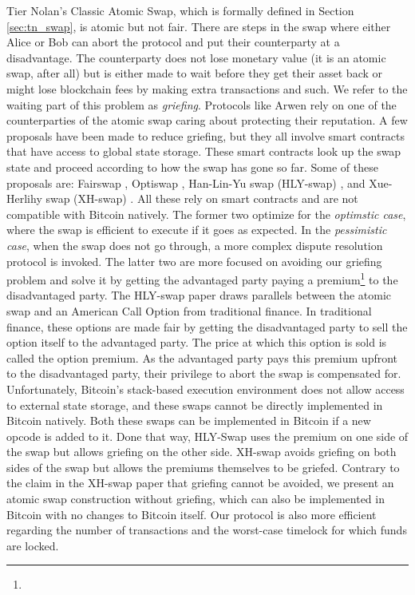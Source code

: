 Tier Nolan's Classic Atomic Swap, which is formally defined in Section \ref{sec:tn_swap}, is atomic but not fair. There are steps in the swap where either Alice or Bob can abort the protocol and put their counterparty at a disadvantage. The counterparty does not lose monetary value (it is an atomic swap, after all) but is either made to wait before they get their asset back or might lose blockchain fees by making extra transactions and such. We refer to the waiting part of this problem as \textit{griefing}. Protocols like Arwen \cite{arwen_protocol} rely on one of the counterparties of the atomic swap caring about protecting their reputation. A few proposals have been made to reduce griefing, but they all involve smart contracts that have access to global state storage. These smart contracts look up the swap state and proceed according to how the swap has gone so far. Some  of these proposals are: Fairswap \cite{fairswap}, Optiswap \cite{optiswap}, Han-Lin-Yu swap (HLY-swap) \cite{atomic_swaps_american_call_options}, and Xue-Herlihy swap (XH-swap) \cite{xue_herlihy_swap}. All these rely on smart contracts and are not compatible with Bitcoin natively. The former two optimize for the \textit{optimstic case}, where the swap is efficient to execute if it goes as expected. In the \textit{pessimistic case}, when the swap does not go through, a more complex dispute resolution protocol is invoked. The latter two are more focused on avoiding our griefing problem and solve it by getting the advantaged party paying a premium\footnote{} to the disadvantaged party. The HLY-swap paper draws parallels between the atomic swap and an American Call Option from traditional finance. In traditional finance, these options are made fair by getting the disadvantaged party to sell the option itself to the advantaged party. The price at which this option is sold is called the option premium. As the advantaged party pays this premium upfront to the disadvantaged party, their privilege to abort the swap is compensated for. Unfortunately, Bitcoin's stack-based execution environment does not allow access to external state storage, and these swaps cannot be directly implemented in Bitcoin natively. Both these swaps can be implemented in Bitcoin if a new opcode is added to it. Done that way, HLY-Swap uses the premium on one side of the swap but allows griefing on the other side. XH-swap avoids griefing on both sides of the swap but allows the premiums themselves to be griefed. Contrary to the claim in the XH-swap paper that griefing cannot be avoided, we present an atomic swap construction without griefing, which can also be implemented in Bitcoin with no changes to Bitcoin itself. Our protocol is also more efficient regarding the number of transactions and the worst-case timelock for which funds are locked.

